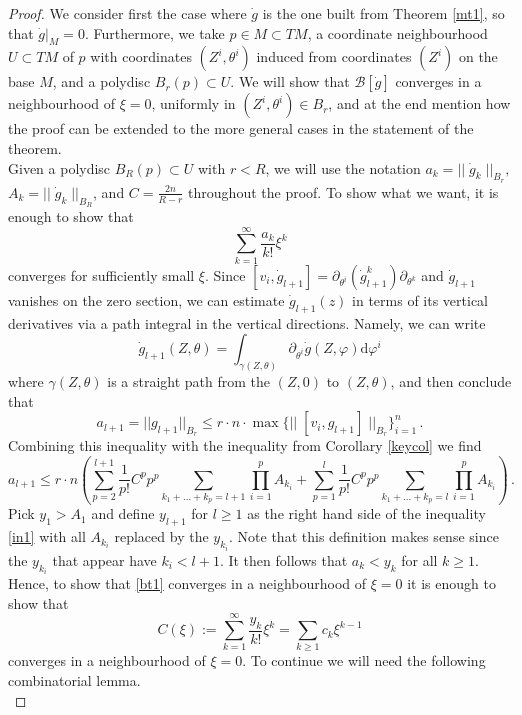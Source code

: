 \documentclass[10pt,a4paper]{amsart}
\begin{document}
\begin{proof}
    We consider first the case where $\dot{g}$ is the one built from Theorem \ref{mt1}, so that $\dot{g}|_M=0$. Furthermore, we take  $p\in M\subset TM$, a coordinate neighbourhood $U\subset TM$ of $p$ with coordinates $(Z^i,\theta^i)$ induced from coordinates $(Z^i)$ on the base $M$, and a polydisc $B_r(p)\subset U$. We will show that $\mathcal{B}[\dot{g}]$ converges in a neighbourhood of $\xi=0$, uniformly in $(Z^i,\theta^i)\in B_r$, and at the end mention how the proof can be extended to the more general cases in the statement of the theorem. \\
    
    Given a polydisc $B_R(p)\subset U$ with $r<R$, we will use the notation $a_k=|| \; \dot{g}_k \; ||_{B_r},$ $A_k=||\; \dot{g}_k\;||_{B_R} $,  and $C=\frac{2n}{R-r}$ throughout the proof.  To show what we want, it is enough to show that
    \begin{equation}\label{bt1}
        \sum_{k=1}^{\infty}\frac{a_k}{k!}\xi^{k}
    \end{equation} converges for sufficiently small $\xi$. Since $[v_i,\dot{g}_{l+1}]=\partial_{\theta^{i}}(\dot{g}_{l+1}^{k})\partial_{\theta^k}$ and $\dot{g}_{l+1}$ vanishes on the zero section,  we can estimate $\dot{g}_{l+1}(z)$ in terms of its vertical derivatives via a path integral in the vertical directions. Namely, we can  write
    \begin{equation}\label{pathintest}
        \dot{g}_{l+1}(Z,\theta)=\int_{\gamma(Z,\theta)}\partial_{\theta^i}\dot{g}(Z, \varphi)\mathrm{d}\varphi^i
    \end{equation}
    where $\gamma(Z,\theta)$ is a straight path from the $(Z,0)$ to $(Z,\theta)$, and then conclude that   \begin{equation*}
    a_{l+1}=||g_{l+1}||_{B_r}\leq r\cdot n \cdot \max\{||\;[v_i, g_{l+1}]\;||_{B_r}\}_{i=1}^{n}\,.
\end{equation*} 
Combining this inequality with the inequality from Corollary \ref{keycol} we find
\begin{equation}\label{in1}
    a_{l+1} \leq r\cdot n\left(\sum_{p=2}^{l+1}\frac{1}{p!}C^pp^p\sum_{k_1+...+k_p=l+1}\prod_{i=1}^{p}A_{k_i}+\sum_{p=1}^{l}\frac{1}{p!}C^pp^p\sum_{k_1+...+k_p=l}\prod_{i=1}^{p}A_{k_i}\right)\,.
\end{equation}
Pick $y_1>A_1$ and define  $y_{l+1}$ for $l\geq 1$ as the right hand side of the inequality \eqref{in1} with all $A_{k_i}$ replaced by the $y_{k_i}$. Note that this definition makes sense since the $y_{k_i}$ that appear have $k_i<l+1$. It then follows that $a_{k}<y_{k}$ for all $k\geq 1$. Hence, to show that \eqref{bt1} converges in a neighbourhood of $\xi=0$ it is enough to show that 
\begin{equation*}
    C(\xi):=\sum_{k=1}^{\infty}\frac{y_k}{k!}\xi^{k}=\sum_{k\geq 1}c_k\xi^{k-1}
\end{equation*}
converges in a neighbourhood of $\xi=0$. To continue we will need the following combinatorial lemma.\\


\end{proof}
\end{document}
